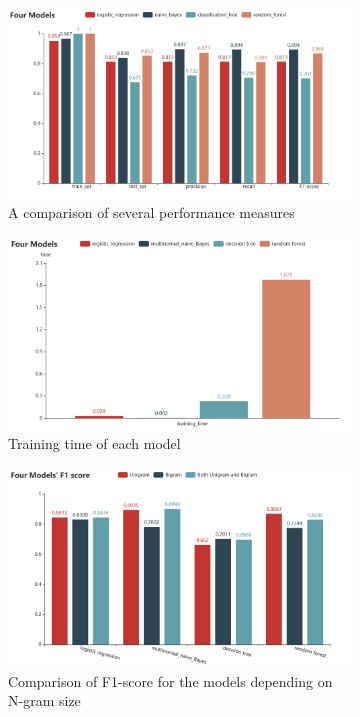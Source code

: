 \documentclass[a4paper, 11pt]{article}
\begin{document}
\begin{figure}
    \centering
    \begin{subfigure}[t]{0.7\textwidth}
        \includegraphics[width=\textwidth]{figures/four models(1).png}
        \caption{A comparison of several performance measures}\label{results:perf}
    \end{subfigure}
    \begin{subfigure}[t]{0.7\textwidth}
        \includegraphics[width=\textwidth]{figures/training time.png}
        \caption{Training time of each model}\label{results:time}
    \end{subfigure}
    \begin{subfigure}[t]{0.7\textwidth}
        \includegraphics[width=\textwidth]{figures/Four Models' F1 score.png}
        \caption{Comparison of F1-score for the models depending on N-gram size}
        \label{results:n-grams}
    \end{subfigure}
\caption{}
\end{figure}
\end{document}
